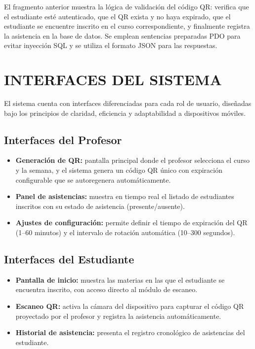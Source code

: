 \documentclass[12pt, letterpaper, oneside]{report}
\begin{document}
El fragmento anterior muestra la l\'ogica de validaci\'on del c\'odigo QR: verifica que el estudiante est\'e autenticado, que el QR exista y no haya expirado, que el estudiante se encuentre inscrito en el curso correspondiente, y finalmente registra la asistencia en la base de datos. Se emplean sentencias preparadas PDO para evitar inyecci\'on SQL y se utiliza el formato JSON para las respuestas.

\newpage

\chapter{INTERFACES DEL SISTEMA}

El sistema cuenta con interfaces diferenciadas para cada rol de usuario, dise\~nadas bajo los principios de claridad, eficiencia y adaptabilidad a dispositivos m\'oviles.

\section{Interfaces del Profesor}

\begin{itemize}
  \item \textbf{Generaci\'on de QR:} pantalla principal donde el profesor selecciona el curso y la semana, y el sistema genera un c\'odigo QR \'unico con expiraci\'on configurable que se autoregenera autom\'aticamente.
  \item \textbf{Panel de asistencias:} muestra en tiempo real el listado de estudiantes inscritos con su estado de asistencia (presente/ausente).
  \item \textbf{Ajustes de configuraci\'on:} permite definir el tiempo de expiraci\'on del QR (1--60 minutos) y el intervalo de rotaci\'on autom\'atica (10--300 segundos).
\end{itemize}

\section{Interfaces del Estudiante}

\begin{itemize}
  \item \textbf{Pantalla de inicio:} muestra las materias en las que el estudiante se encuentra inscrito, con acceso directo al m\'odulo de escaneo.
  \item \textbf{Escaneo QR:} activa la c\'amara del dispositivo para capturar el c\'odigo QR proyectado por el profesor y registra la asistencia autom\'aticamente.
  \item \textbf{Historial de asistencia:} presenta el registro cronol\'ogico de asistencias del estudiante.
\end{itemize}
\end{document}
